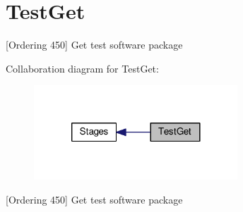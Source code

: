 \hypertarget{group___test_get}{\section{Test\-Get}
\label{group___test_get}
}


\mbox{[}Ordering 450\mbox{]} Get test software package  


Collaboration diagram for Test\-Get\-:
\nopagebreak
\begin{figure}[H]
\begin{center}
\leavevmode
\includegraphics[width=216pt]{group___test_get}
\end{center}
\end{figure}
\mbox{[}Ordering 450\mbox{]} Get test software package 
